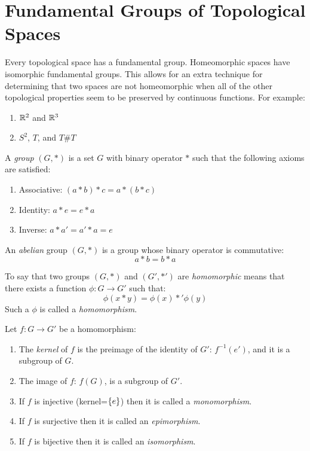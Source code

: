 \documentclass[letterpaper,12pt,fleqn]{article}
\newcommand{\p}{\phi}
\begin{document}
\section*{Fundamental Groups of Topological Spaces}

Every topological space has a fundamental group.  Homeomorphic spaces have isomorphic fundamental groups.  This
allows for an extra technique for determining that two spaces are not homeomorphic when all of the other
topological properties seem to be preserved by continuous functions.  For example:
\begin{enumerate}
\item \(\mathbb{R}^2\) and \(\mathbb{R}^3\)
\item \(S^2\), \(T\), and \(T\#T\)
\end{enumerate}

\begin{definition}[Group]
  A \emph{group} \((G,*)\) is a set \(G\) with binary operator \(*\) such that the following axioms are satisfied:
  \begin{enumerate}
  \item Associative: \((a*b)*c=a*(b*c)\)
  \item Identity: \(a*e=e*a\)
  \item Inverse: \(a*a'=a'*a=e\)
  \end{enumerate}
\end{definition}

\begin{definition}
  An \emph{abelian} group \((G,*)\) is a group whose binary operator is commutative:
  \[a*b=b*a\]
\end{definition}

\begin{definition}[Homomorphic]
  To say that two groups \((G,*)\) and \((G',*')\) are \emph{homomorphic} means that there exists a function
  \(\p:G\to G'\) such that:
  \[\p(x*y)=\p(x)*'\p(y)\]
  Such a \(\p\) is called a \emph{homomorphism}.
\end{definition}

\begin{properties}[Homomorphism]
  Let \(f:G\to G'\) be a homomorphism:
  \begin{enumerate}
  \item The \emph{kernel} of \(f\) is the preimage of the identity of \(G'\): \(f^{-1}(e')\), and it is a subgroup
    of \(G\).
  \item The image of \(f\): \(f(G)\), is a subgroup of \(G'\).
  \item If \(f\) is injective (kernel=\(\{e\}\)) then it is called a \emph{monomorphism}.
  \item If \(f\) is surjective then it is called an \emph{epimorphism}.
  \item If \(f\) is bijective then it is called an \emph{isomorphism}.
  \end{enumerate}
\end{properties}
\end{document}

